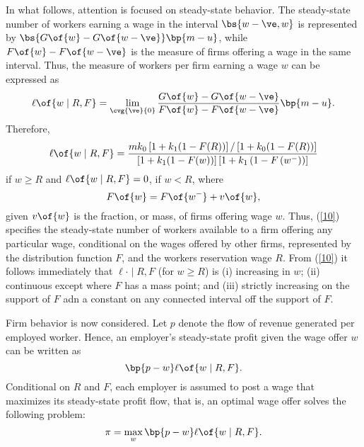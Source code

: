 \documentclass[12pt]{article}
\theoremstyle{definition}
\begin{document}
In what follows, attention is focused on steady-state behavior. The steady-state number of workers earning a wage in the interval $\bs{w - \ve, w}$ is represented by $\bs{G\of{w} - G\of{w-\ve}}\bp{m-u}$, while $F\of{w} - F\of{w - \ve}$ is the measure of firms offering a wage in the same interval. Thus, the measure of workers per firm earning a wage $w$ can be expressed as 
\begin{equation}
    \notag 
    \ell\of{w \mid R, F} = \lim_{\cvg{\ve}{0}} \frac{G\of{w} - G\of{w-\ve}}{F\of{w} - F\of{w - \ve}}\bp{m-u}.
\end{equation}
Therefore, 
\begin{equation}
    \label{10} 
    \ell\of{w \mid R, F} = \frac{m k_0\left[1+k_1(1-F(R))\right] /\left[1+k_0(1-F(R))\right]}{\left[1+k_1(1-F(w))\right]\left[1+k_1\left(1-F\left(w^{-}\right)\right)\right]}
\end{equation}
if $w \geq R$ and $\ell\of{w \mid R, F} = 0$, if $w < R$, where 
\begin{equation}
    \notag 
    F\of{w} = F\of{w^{-}} + v\of{w},
\end{equation}
given $v\of{w}$ is the fraction, or mass, of firms offering wage $w$. Thus, (\ref{10}) specifies the steady-state number of workers available to a firm offering any particular wage, conditional on the wages offered by other firms, represented by the distribution function $F$, and the workers reservation wage $R$. From (\ref{10}) it follows immediately that $\ell{\cdot \mid R, F}$ (for $w \geq R$) is (i) increasing in $w$; (ii) continuous except where $F$ has a mass point; and (iii) strictly increasing on the support of $F$ adn a constant on any connected interval off the support of $F$. 

Firm behavior is now considered. Let $p$ denote the flow of revenue generated per employed worker. Hence, an employer's steady-state profit given the wage offer $w$ can be written as 
$$\bp{p - w} \ell\of{w \mid R, F}.$$
Conditional on $R$ and $F$, each employer is assumed to post a wage that maximizes its steady-state profit flow, that is, an optimal wage offer solves the following problem:
\begin{equation}
    \label{11}
    \pi = \max_w \bp{p - w} \ell\of{w \mid R, F}.
\end{equation}
\end{document}
